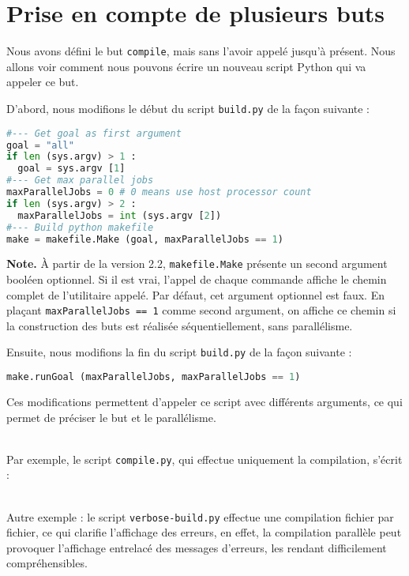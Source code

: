 \documentclass[a4paper,11pt]{extarticle}
\begin{document}
\section{Prise en compte de plusieurs buts}

Nous avons défini le but \texttt{compile}, mais sans l'avoir appelé jusqu'à présent. Nous allons voir comment nous pouvons écrire un nouveau script Python qui va appeler ce but.

D'abord, nous modifions le début du script \texttt{build.py} de la façon suivante :
\begin{lstlisting}[language=py]
#--- Get goal as first argument
goal = "all"
if len (sys.argv) > 1 :
  goal = sys.argv [1]
#--- Get max parallel jobs
maxParallelJobs = 0 # 0 means use host processor count
if len (sys.argv) > 2 :
  maxParallelJobs = int (sys.argv [2])
#--- Build python makefile
make = makefile.Make (goal, maxParallelJobs == 1)
\end{lstlisting}

{\bf Note.}\label{logUtilityToolPath2} À partir de la version 2.2, \texttt{makefile.Make} présente un second argument booléen optionnel.  Si il est vrai, l'appel de chaque commande affiche le chemin complet de l'utilitaire appelé. Par défaut, cet argument optionnel est faux. En plaçant \texttt{maxParallelJobs == 1} comme second argument, on affiche ce chemin si la construction des buts est réalisée séquentiellement, sans parallélisme.

Ensuite, nous modifions la fin du script \texttt{build.py} de la façon suivante :
\begin{lstlisting}[language=py]
make.runGoal (maxParallelJobs, maxParallelJobs == 1)
\end{lstlisting}

Ces modifications permettent d'appeler ce script avec différents arguments, ce qui permet de préciser le but et le parallélisme.

~\\Par exemple, le script \texttt{compile.py}, qui effectue uniquement la compilation, s'écrit :



~\\Autre exemple : le script \texttt{verbose-build.py} effectue une compilation fichier par fichier, ce qui clarifie l'affichage des erreurs, en effet, la compilation parallèle peut provoquer l'affichage entrelacé des messages d'erreurs, les rendant difficilement compréhensibles.

\end{document}

